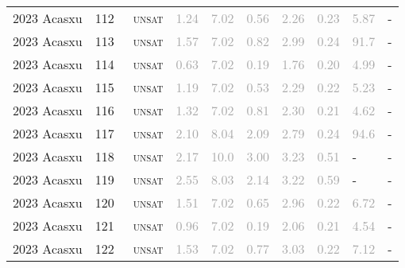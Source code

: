 \begin{center}
{\begin{longtable}{@{}llllllllll@{}}
2023 Acasxu & 112 & ~\textsc{unsat} & \textcolor{darkgray}{1.24} & \textcolor{darkgray}{7.02} & \textcolor{darkgray}{0.56} & \textcolor{darkgray}{2.26} & \textcolor{darkgray}{0.23} & \textcolor{darkgray}{5.87} & - \\
2023 Acasxu & 113 & ~\textsc{unsat} & \textcolor{darkgray}{1.57} & \textcolor{darkgray}{7.02} & \textcolor{darkgray}{0.82} & \textcolor{darkgray}{2.99} & \textcolor{darkgray}{0.24} & \textcolor{darkgray}{91.7} & - \\
2023 Acasxu & 114 & ~\textsc{unsat} & \textcolor{darkgray}{0.63} & \textcolor{darkgray}{7.02} & \textcolor{darkgray}{0.19} & \textcolor{darkgray}{1.76} & \textcolor{darkgray}{0.20} & \textcolor{darkgray}{4.99} & - \\
2023 Acasxu & 115 & ~\textsc{unsat} & \textcolor{darkgray}{1.19} & \textcolor{darkgray}{7.02} & \textcolor{darkgray}{0.53} & \textcolor{darkgray}{2.29} & \textcolor{darkgray}{0.22} & \textcolor{darkgray}{5.23} & - \\
2023 Acasxu & 116 & ~\textsc{unsat} & \textcolor{darkgray}{1.32} & \textcolor{darkgray}{7.02} & \textcolor{darkgray}{0.81} & \textcolor{darkgray}{2.30} & \textcolor{darkgray}{0.21} & \textcolor{darkgray}{4.62} & - \\
2023 Acasxu & 117 & ~\textsc{unsat} & \textcolor{darkgray}{2.10} & \textcolor{darkgray}{8.04} & \textcolor{darkgray}{2.09} & \textcolor{darkgray}{2.79} & \textcolor{darkgray}{0.24} & \textcolor{darkgray}{94.6} & - \\
2023 Acasxu & 118 & ~\textsc{unsat} & \textcolor{darkgray}{2.17} & \textcolor{darkgray}{10.0} & \textcolor{darkgray}{3.00} & \textcolor{darkgray}{3.23} & \textcolor{darkgray}{0.51} & - & - \\
2023 Acasxu & 119 & ~\textsc{unsat} & \textcolor{darkgray}{2.55} & \textcolor{darkgray}{8.03} & \textcolor{darkgray}{2.14} & \textcolor{darkgray}{3.22} & \textcolor{darkgray}{0.59} & - & - \\
2023 Acasxu & 120 & ~\textsc{unsat} & \textcolor{darkgray}{1.51} & \textcolor{darkgray}{7.02} & \textcolor{darkgray}{0.65} & \textcolor{darkgray}{2.96} & \textcolor{darkgray}{0.22} & \textcolor{darkgray}{6.72} & - \\
2023 Acasxu & 121 & ~\textsc{unsat} & \textcolor{darkgray}{0.96} & \textcolor{darkgray}{7.02} & \textcolor{darkgray}{0.19} & \textcolor{darkgray}{2.06} & \textcolor{darkgray}{0.21} & \textcolor{darkgray}{4.54} & - \\
2023 Acasxu & 122 & ~\textsc{unsat} & \textcolor{darkgray}{1.53} & \textcolor{darkgray}{7.02} & \textcolor{darkgray}{0.77} & \textcolor{darkgray}{3.03} & \textcolor{darkgray}{0.22} & \textcolor{darkgray}{7.12} & - \\

\end{longtable}}
\end{center}
